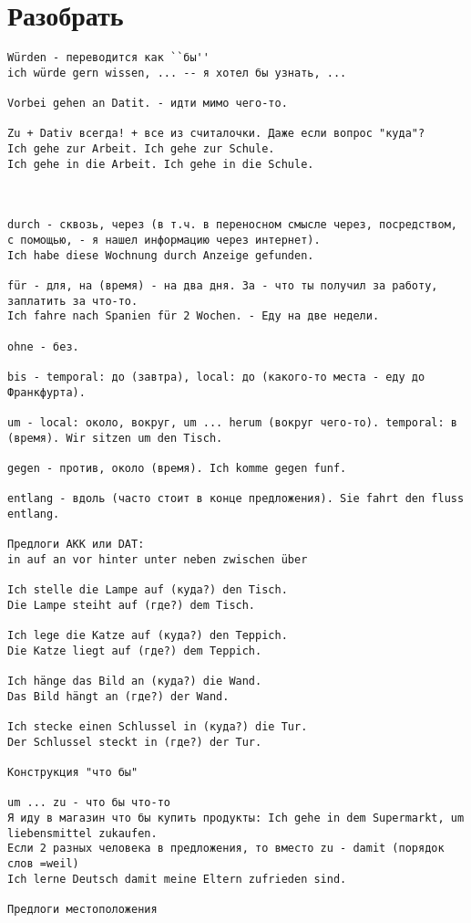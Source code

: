 \documentclass[12pt,a4paper]{report}
\begin{document}
\chapter{Разобрать}
\begin{verbatim}
Würden - переводится как ``бы''
ich würde gern wissen, ... -- я хотел бы узнать, ...

Vorbei gehen an Datit. - идти мимо чего-то.

Zu + Dativ всегда! + все из считалочки. Даже если вопрос "куда"?
Ich gehe zur Arbeit. Ich gehe zur Schule.
Ich gehe in die Arbeit. Ich gehe in die Schule.



durch - сквозь, через (в т.ч. в переносном смысле через, посредством, с помощью, - я нашел информацию через интернет).
Ich habe diese Wochnung durch Anzeige gefunden.

für - для, на (время) - на два дня. За - что ты получил за работу, заплатить за что-то.
Ich fahre nach Spanien für 2 Wochen. - Еду на две недели.

ohne - без.

bis - temporal: до (завтра), local: до (какого-то места - еду до Франкфурта).

um - local: около, вокруг, um ... herum (вокруг чего-то). temporal: в (время). Wir sitzen um den Tisch.

gegen - против, около (время). Ich komme gegen funf.

entlang - вдоль (часто стоит в конце предложения). Sie fahrt den fluss entlang.

Предлоги AKK или DAT:
in auf an vor hinter unter neben zwischen über

Ich stelle die Lampe auf (куда?) den Tisch.
Die Lampe steiht auf (где?) dem Tisch.

Ich lege die Katze auf (куда?) den Teppich.
Die Katze liegt auf (где?) dem Teppich.

Ich hänge das Bild an (куда?) die Wand.
Das Bild hängt an (где?) der Wand.

Ich stecke einen Schlussel in (куда?) die Tur.
Der Schlussel steckt in (где?) der Tur.

Конструкция "что бы"

um ... zu - что бы что-то
Я иду в магазин что бы купить продукты: Ich gehe in dem Supermarkt, um liebensmittel zukaufen.
Если 2 разных человека в предложения, то вместо zu - damit (порядок слов =weil)
Ich lerne Deutsch damit meine Eltern zufrieden sind.

Предлоги местоположения


\end{verbatim}
\end{document}
